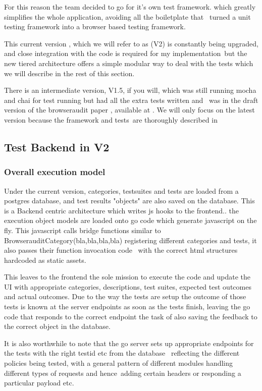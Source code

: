 For this reason the team decided to go for it's own test framework. which greatly simplifies the whole application, avoiding all the boiletplate that \
turned a unit testing framework into a browser based testing framework.

This current version , which we will refer to as (V2) is constantly being upgraded, and close integration with the code is required for my implementation\
but the new tiered architecture offers a simple modular way to deal with the tests which we will describe in the rest of this section. 

There is an intermediate version, V1.5, if you will, which was still running mocha and chai for test running but had all the extra tests written and \
was in the draft version of the browseraudit paper , available at \cite{maffeis}. We will only focus on the latest version because the framework and tests\
are thoroughly described in \cite{charlie}

\subsection{Test Backend in V2}

\subsubsection{Overall execution model}

Under the current version, categories, testsuites and tests are loaded from a postgres database, and test results "objects" are also saved on the database.
This is a Backend centric architecture which writes js hooks to the frontend.. the execution object models are loaded onto go code which generate javascript on the fly.
This javascript calls bridge functions similar to BrowserauditCategory(bla,bla,bla,bla) registering different categories and tests, it also passes their function invocation code \
with the correct html structures hardcoded as static assets.

This leaves to the frontend the sole mission to execute the code and update the UI with appropriate categories, descriptions, test suites, expected test  outcomes
and actual outcomes. Due to the way the tests are setup the outcome of those tests is known at the server endpoints as soon as the tests finish, leaving the 
go code that responds to the correct endpoint the task of also saving the feedback to the correct object in the database. 

It is also worthwhile to note that the go server sets up appropriate endpoints for the tests with the right testid etc from the database \
reflecting the different policies being tested, with a general pattern of different modules handling different types of requests and hence\
adding certain headers or responding a particular payload etc.\

